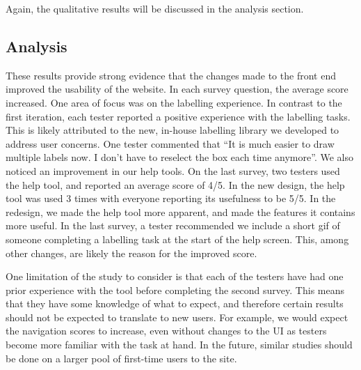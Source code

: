 \documentclass[12pt, titlepage]{article}
\begin{document}
\begin{centering}
\end{centering}

Again, the qualitative results will be discussed in the analysis section.

\subsection{Analysis}
These results provide strong evidence that the changes made to the front end improved the usability of the website. In each survey question, the average score increased.
One area of focus was on the labelling experience. In contrast to the first iteration, each tester reported a positive experience with the labelling tasks. This is likely attributed to the 
new, in-house labelling library we developed to address user concerns. One tester commented that ``It is much easier to draw multiple labels now. I don't have to reselect the box each time anymore''.
We also noticed an improvement in our help tools. On the last survey, two testers used the help tool, and reported an average score of 4/5. In the new design, the help tool was used 3 times with everyone reporting its usefulness to be 5/5.
In the redesign, we made the help tool more apparent, and made the features it contains more useful. In the last survey, a tester recommended we include a short gif of someone completing a labelling task at the start of the help screen. This, among other changes, are likely the reason for the improved score.


One limitation of the study to consider is that each of the testers have had one prior experience with the tool before completing the second survey. This means that they have some knowledge of what to expect, and therefore certain results should not be expected to translate to new users. 
For example, we would expect the navigation scores to increase, even without changes to the UI as testers become more familiar with the task at hand. In the future, similar studies should be done on a larger pool of first-time users to the site.
\end{document}
